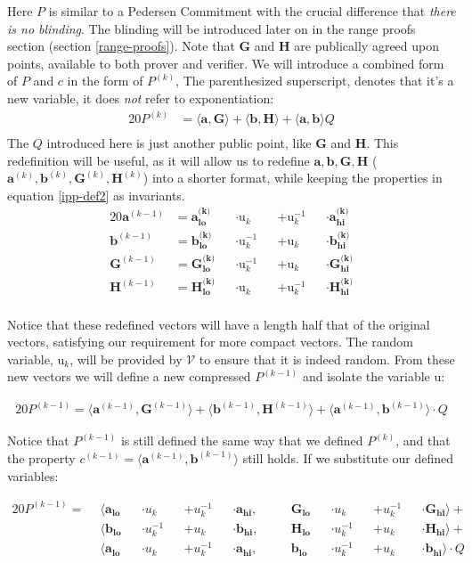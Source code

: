\documentclass{article}
\newcommand{\eq}[1]{\begin{alignat*}{20}#1\end{alignat*}}
\renewcommand{\vec}[1]{\boldsymbol{#1}}
\newcommand{\ran}[1]{\mathrm{#1}}
\newcommand{\V}{\mathcal{V}}
\newcommand{\dotp}[2]{\langle #1, #2 \rangle}
\newcommand{\opn}[1]{\operatorname{#1}}
\newcommand{\veclo}[1]{\vec{#1_{\opn{lo}}}}
\newcommand{\vechi}[1]{\vec{#1_{\opn{hi}}}}
\begin{document}
Here $P$ is similar to a Pedersen Commitment with the crucial difference
that \textit{there is no blinding}. The blinding will be introduced
later on in the range proofs section (section \ref{range-proofs}). Note
that $\vec{G}$ and $\vec{H}$ are publically agreed upon points,
available to both prover and verifier. We will introduce a combined
form of $P$ and $c$ in the form of $P^{(k)}$, The parenthesized
superscript, denotes that it's a new variable, it does \textit{not}
refer to exponentiation:
\eq{
	P^{(k)} &= \dotp{\vec{a}}{\vec{G}} +
	           \dotp{\vec{b}}{\vec{H}} +
	           \dotp{\vec{a}}{\vec{b}}Q \\
} 
The $Q$ introduced here is just another public point,
like $\vec{G}$ and $\vec{H}$. This redefinition will be useful, as
it will allow us to redefine $\vec{a}, \vec{b}, \vec{G}, \vec{H}$
($\vec{a}^{(k)}, \vec{b}^{(k)}, \vec{G}^{(k)}, \vec{H}^{(k)}$) into a
shorter format, while keeping the properties in equation \ref{ipp-def2}
as invariants.
\eq{
	\vec{a}^{(k-1)} &= \veclo{a^{\text{(k)}}} &&\cdot \ran{u}_k      &&+ \ran{u}^{-1}_k &&\cdot \vechi{a^{\text{(k)}}} \\
	\vec{b}^{(k-1)} &= \veclo{b^{\text{(k)}}} &&\cdot \ran{u}^{-1}_k &&+ \ran{u}_k      &&\cdot \vechi{b^{\text{(k)}}} \\
	\vec{G}^{(k-1)} &= \veclo{G^{\text{(k)}}} &&\cdot \ran{u}^{-1}_k &&+ \ran{u}_k      &&\cdot \vechi{G^{\text{(k)}}} \\
	\vec{H}^{(k-1)} &= \veclo{H^{\text{(k)}}} &&\cdot \ran{u}_k      &&+ \ran{u}^{-1}_k &&\cdot \vechi{H^{\text{(k)}}} \\
}

Notice that these redefined vectors will have a length half that
of the original vectors, satisfying our requirement for more compact
vectors. The random variable, $\ran{u}_k$, will be provided by $\V$
to ensure that it is indeed random. From these new vectors we will
define a new compressed $P^{(k-1)}$ and isolate the variable $\ran{u}$:

\eq{
	P^{(k-1)} =
	\dotp{\vec{a}^{(k-1)}}{\vec{G}^{(k-1)}} +
	\dotp{\vec{b}^{(k-1)}}{\vec{H}^{(k-1)}} +
	\dotp{\vec{a}^{(k-1)}}{\vec{b}^{(k-1)}} \cdot Q
}

Notice that $P^{(k-1)}$ is still defined the same way
that we defined $P^{(k)}$, and that the property $c^{(k-1)} =
\dotp{\vec{a}^{(k-1)}}{\vec{b}^{(k-1)}}$ still holds. If we substitute
our defined variables:

\eq{
	P^{(k-1)} = \: \:
	&\dotp
		{        \veclo{a} &&\cdot u_k      &&+ u_k^{-1} &&\cdot \vechi{a}}
		{&&\quad \veclo{G} &&\cdot u_k      &&+ u_k^{-1} &&\cdot \vechi{G}}
	+ \\
	&\dotp
		{        \veclo{b} &&\cdot u_k^{-1} &&+ u_k      &&\cdot \vechi{b}}
		{&&\quad \veclo{H} &&\cdot u_k^{-1} &&+ u_k      &&\cdot \vechi{H}}
	+ \\
	&\dotp
		{        \veclo{a} &&\cdot u_k      &&+ u_k^{-1} &&\cdot \vechi{a}}
		{&&\quad \veclo{b} &&\cdot u_k^{-1} &&+ u_k      &&\cdot \vechi{b}}
	\cdot Q
}
\end{document}
